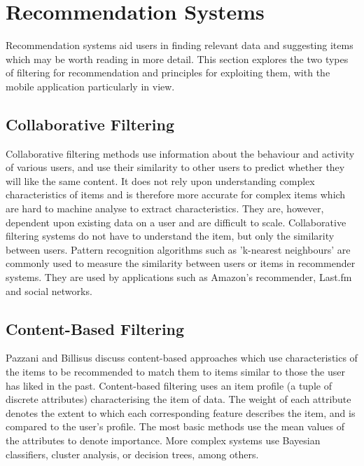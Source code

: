 \section{Recommendation Systems}

Recommendation systems aid users in finding relevant data and suggesting items which may be worth reading in more detail. This section explores the two types of filtering for recommendation and principles for exploiting them, with the mobile application particularly in view.

\subsection{Collaborative Filtering}

Collaborative filtering methods \cite{CollaborativeRecommenderGoldberg} use information about the behaviour and activity of various users, and use their similarity to other users to predict whether they will like the same content. It does not rely upon understanding complex characteristics of items and is therefore more accurate for complex items which are hard to machine analyse to extract characteristics. They are, however, dependent upon existing data on a user and are difficult to scale. Collaborative filtering systems do not have to understand the item, but only the similarity between users. Pattern recognition algorithms such as 'k-nearest neighbours' are commonly used to measure the similarity between users or items in recommender systems. They are used by applications such as Amazon's recommender, Last.fm and social networks. 

\subsection{Content-Based Filtering}

Pazzani and Billisus discuss content-based approaches \cite{ContentRecommenderPazzani} which use characteristics of the items to be recommended to match them to items similar to those the user has liked in the past. Content-based filtering uses an item profile (a tuple of discrete attributes) characterising the item of data. The weight of each attribute denotes the extent to which each corresponding feature describes the item, and is compared to the user's profile. The most basic methods use the mean values of the attributes to denote importance. More complex systems use Bayesian classifiers, cluster analysis, or decision trees, among others.

